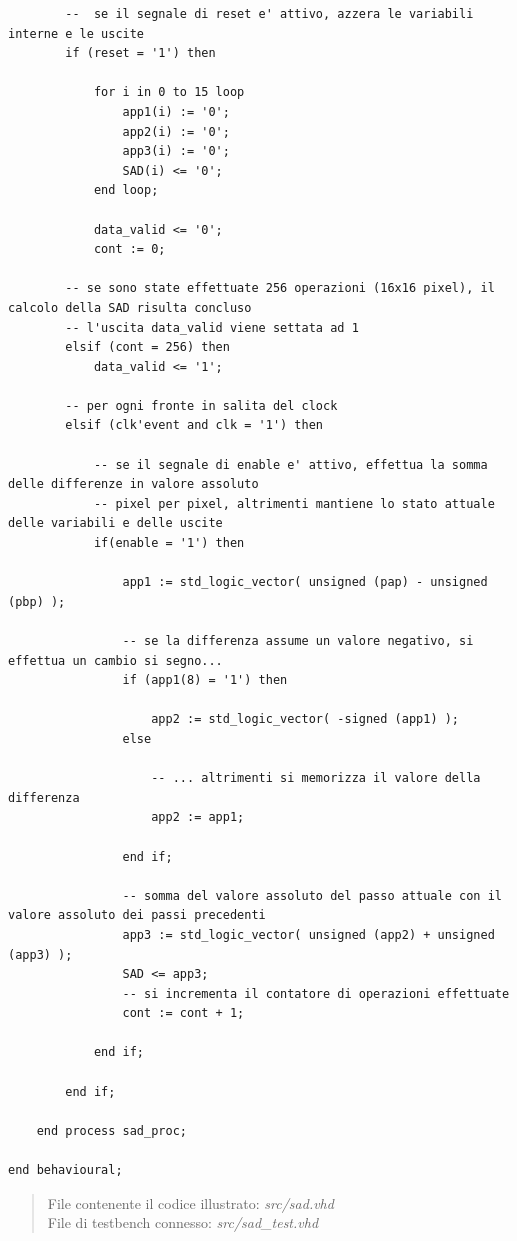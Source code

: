 \documentclass[12pt, a4paper]{article}
\begin{document}
{\begin{verbatim}
		--  se il segnale di reset e' attivo, azzera le variabili interne e le uscite 
		if (reset = '1') then

			for i in 0 to 15 loop
				app1(i) := '0';
				app2(i) := '0';
				app3(i) := '0';
				SAD(i) <= '0';
			end loop;
			
			data_valid <= '0';
			cont := 0;
		
		-- se sono state effettuate 256 operazioni (16x16 pixel), il calcolo della SAD risulta concluso 
		-- l'uscita data_valid viene settata ad 1
		elsif (cont = 256) then
			data_valid <= '1';

		-- per ogni fronte in salita del clock 
		elsif (clk'event and clk = '1') then

			-- se il segnale di enable e' attivo, effettua la somma delle differenze in valore assoluto
			-- pixel per pixel, altrimenti mantiene lo stato attuale delle variabili e delle uscite
			if(enable = '1') then		
	
				app1 := std_logic_vector( unsigned (pap) - unsigned (pbp) );

				-- se la differenza assume un valore negativo, si effettua un cambio si segno...
				if (app1(8) = '1') then

					app2 := std_logic_vector( -signed (app1) );
				else 
		
					-- ... altrimenti si memorizza il valore della differenza
					app2 := app1;

				end if;

				-- somma del valore assoluto del passo attuale con il valore assoluto dei passi precedenti
				app3 := std_logic_vector( unsigned (app2) + unsigned (app3) );
				SAD <= app3;
				-- si incrementa il contatore di operazioni effettuate
				cont := cont + 1; 

			end if;

		end if;

	end process sad_proc;
		
end behavioural;
\end{verbatim}
}
\begin{quote}
File contenente il codice illustrato: \textit{src/sad.vhd}\\
File di testbench connesso: \textit{src/sad\_test.vhd}
\end{quote}
\newpage
\end{document}
